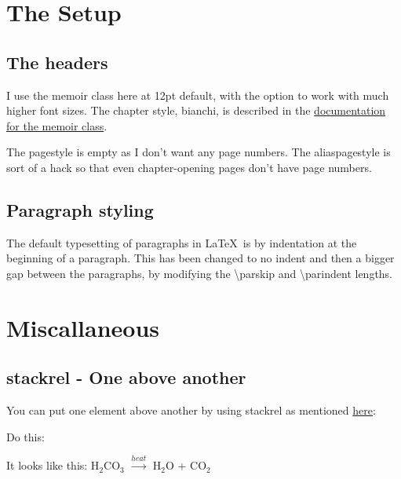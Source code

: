 \documentclass[a4paper,extrafontsizes,12pt,twoside,openany]{memoir}
\newcommand{\showpart}[1]{\noindent}
\begin{document}
\chapter{The Setup}

\section{The headers}

I use the memoir class here at 12pt default, with the option to work with much higher font sizes. The chapter style,
bianchi, is described in the
\href{ftp://tug.ctan.org/pub/tex-archive/macros/latex/contrib/memoir/memman.pdf}{documentation for the memoir class}.

The pagestyle is empty as I don't want any page numbers. The aliaspagestyle is sort of a hack so that even
chapter-opening pages don't have page numbers.

\showpart{HEADER}

\section{Paragraph styling}

The default typesetting of paragraphs in \LaTeX\ is by indentation at the beginning of a paragraph. This has been changed
to no indent and then a bigger gap between the paragraphs, by modifying the \textbackslash{}parskip and \textbackslash{}parindent lengths.

\showpart{PARAGRAPHSTYLES}

\chapter{Miscallaneous}

\section{stackrel - One above another}

You can put one element above another by using stackrel as mentioned
\href{http://www.uz.ac.zw/science/maths/latex/stackrel.html}{here}:

Do this: \showpart{STACKREL}

It looks like this:
H$_2$CO$_3$ $\stackrel{heat}{\longrightarrow}$ H$_2$O + CO$_2$
\end{document}
